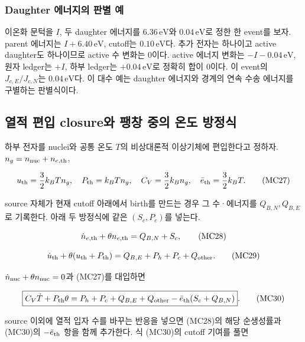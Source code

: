 \hypertarget{daughter-uxc5d0uxb108uxc9c0uxc758-uxd310uxbcc4-uxc608}{%
\subsubsection{Daughter 에너지의 판별 예}\label{daughter-uxc5d0uxb108uxc9c0uxc758-uxd310uxbcc4-uxc608}}

이온화 문턱을 \(I\), 두 daughter 에너지를 \(6.36\,\mathrm{eV}\)와 \(0.04\,\mathrm{eV}\)로 정한 한 event를 보자. parent 에너지는 \(I+6.40\,\mathrm{eV}\), cutoff는 \(0.10\,\mathrm{eV}\)다. 추가 전자는 하나이고 active daughter도 하나이므로 active 수 변화는 0이다. active 에너지 변화는 \(-I-0.04\,\mathrm{eV}\), 원자 ledger는 \(+I\), 하부 ledger는 \(+0.04\,\mathrm{eV}\)로 정확히 합이 0이다. 이 event의 \(J_{c,E}/J_{c,N}\)는 \(0.04\,\mathrm{eV}\)다. 이 대수 예는 daughter 에너지와 경계의 연속 수송 에너지를 구별하는 판별식이다.

\hypertarget{uxc5f4uxc801-uxd3b8uxc785-closureuxc640-uxd33duxcc3d-uxc911uxc758-uxc628uxb3c4-uxbc29uxc815uxc2dd}{%
\subsection{열적 편입 closure와 팽창 중의 온도 방정식}\label{uxc5f4uxc801-uxd3b8uxc785-closureuxc640-uxd33duxcc3d-uxc911uxc758-uxc628uxb3c4-uxbc29uxc815uxc2dd}}

하부 전자를 nuclei와 공통 온도 \(T\)의 비상대론적 이상기체에 편입한다고 정하자. \(n_g=n_{\rm nuc}+n_{e,\rm th}\),

\[
u_{\rm th}=\frac32k_BTn_g,\quad
P_{\rm th}=k_BTn_g,\quad
C_V=\frac32k_Bn_g,\quad\bar e_{\rm th}=\frac32k_BT.
\tag{MC27}
\]

source 자체가 현재 cutoff 아래에서 birth를 만드는 경우 그 수·에너지를 \(Q_{B,N},Q_{B,E}\)로 기록한다. 아래 두 방정식에 같은 \((S_c,P_c)\)를 넣는다.

\[
\dot n_{e,\rm th}+\theta n_{e,\rm th}=Q_{B,N}+S_c,
\tag{MC28}
\]

\[
\dot u_{\rm th}+\theta(u_{\rm th}+P_{\rm th})
=Q_{B,E}+P_h+P_c+Q_{\rm other}.
\tag{MC29}
\]

\(\dot n_{\rm nuc}+\theta n_{\rm nuc}=0\)과 (MC27)를 대입하면

\[
\boxed{C_V\dot T+P_{\rm th}\theta
=P_h+P_c+Q_{B,E}+Q_{\rm other}
-\bar e_{\rm th}(S_c+Q_{B,N})}.
\tag{MC30}
\]

source 이외에 열적 입자 수를 바꾸는 반응을 넣으면 (MC28)의 해당 순생성률과 (MC30)의 \(-\bar e_{\rm th}\) 항을 함께 추가한다. 식 (MC30)의 cutoff 기여를 풀면

